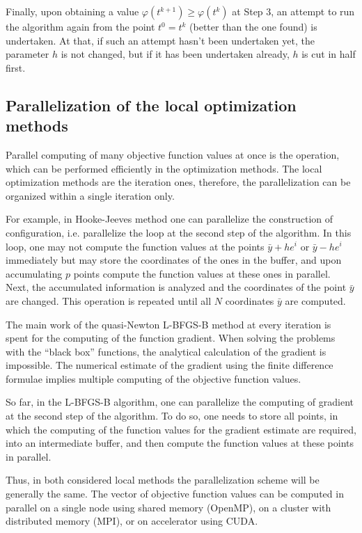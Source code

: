 \documentclass[runningheads]{llncs}
\begin{document}
Finally, upon obtaining a value $\varphi(t^{k+1}) \geq \varphi(t^k)$ at Step 3, an attempt to run the algorithm again from the point $t^0=t^k$ (better than the one found) is undertaken. At that, if such an attempt hasn’t been undertaken yet, the parameter $h$ is not changed, but if it has been undertaken already, $h$ is cut in half first.

\subsection{Parallelization of the local optimization methods}

Parallel computing of many objective function values at once is the operation, which can be performed efficiently in the optimization methods. The local optimization methods are the iteration ones, therefore, the parallelization can be organized within a single iteration only.

For example, in Hooke-Jeeves method one can parallelize the construction of configuration, i.e. parallelize the loop at the second step of the algorithm. In this loop, one may not compute the function values at the points $\bar{y} + he^i$ or $\bar{y} - he^i$ immediately but may store the coordinates of the ones in the buffer, and upon accumulating $p$ points compute the function values at these ones in parallel. Next, the accumulated information is analyzed and the coordinates of the point $\bar{y}$ are changed. This operation is repeated until all $N$ coordinates $\bar{y}$ are computed.

The main work of the quasi-Newton L-BFGS-B method at every iteration is spent for the computing of the function gradient. When solving the problems with the ``black box'' functions, the analytical calculation of the gradient is impossible. The numerical estimate of the gradient using the finite difference formulae implies multiple computing of the objective function values.

So far, in the L-BFGS-B algorithm, one can parallelize the computing of gradient at the second step of the algorithm. To do so, one needs to store all points, in which the computing of the function values for the gradient estimate are required, into an intermediate buffer, and then compute the function values at these points in parallel.

Thus, in both considered local methods the parallelization scheme will be generally the same. The vector of objective function values can be computed in parallel on a single node using shared memory (OpenMP), on a cluster with distributed memory (MPI), or on accelerator using CUDA.
\end{document}

